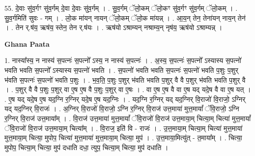 \documentclass[17pt]{extarticle}
\begin{document}
55. दे॒वाः सु॑व॒र्गꣳ सु॑व॒र्गम् दे॒वा दे॒वाः सु॑व॒र्गम् । . सु॒व॒र्गम् ॅलो॒कम् ॅलो॒कꣳ सु॑व॒र्गꣳ सु॑व॒र्गम् ॅलो॒कम् । . सु॒व॒र्गमिति॑ सुवः - गम् । . लो॒क मा॑यन् नायन् ॅलो॒कम् ॅलो॒क मा॑यन्न् । . आ॒य॒न् तेन॒ तेना॑यन् नाय॒न् तेन॑ । . तेन र्.ष॑य॒ ऋष॑य॒ स्तेन॒ तेन र्.ष॑यः । . ऋष॑यो ऽश्राम्यन् नश्राम्य॒न् नृष॑य॒ ऋष॑यो ऽश्राम्यन्न् । \newline

\textbf{Ghana Paata } \newline

1. नास्या᳚स्य॒ न नास्य॑ स॒पत्नः॑ स॒पत्नो᳚ ऽस्य॒ न नास्य॑ स॒पत्नः॑ । . अ॒स्य॒ स॒पत्नः॑ स॒पत्नो᳚ ऽस्यास्य स॒पत्नो॑ भवति भवति स॒पत्नो᳚ ऽस्यास्य स॒पत्नो॑ भवति । . स॒पत्नो॑ भवति भवति स॒पत्नः॑ स॒पत्नो॑ भवति प॒शुः प॒शुर् भ॑वति स॒पत्नः॑ स॒पत्नो॑ भवति प॒शुः । . भ॒व॒ति॒ प॒शुः प॒शुर् भ॑वति भवति प॒शुर् वै वै प॒शुर् भ॑वति भवति प॒शुर् वै । . प॒शुर् वै वै प॒शुः प॒शुर् वा ए॒ष ए॒ष वै प॒शुः प॒शुर् वा ए॒षः । . वा ए॒ष ए॒ष वै वा ए॒ष यद् यदे॒ष वै वा ए॒ष यत् । . ए॒ष यद् यदे॒ष ए॒ष यद॒ग्नि र॒ग्निर् यदे॒ष ए॒ष यद॒ग्निः । . यद॒ग्नि र॒ग्निर् यद् यद॒ग्निर् वि॒राजो॑ वि॒राजो॒ ऽग्निर् यद् यद॒ग्निर् वि॒राजः॑ । . अ॒ग्निर् वि॒राजो॑ वि॒राजो॒ ऽग्नि र॒ग्निर् वि॒राज॑ उत्त॒माया॑ मुत्त॒मायां᳚ ॅवि॒राजो॒ ऽग्नि र॒ग्निर् वि॒राज॑ उत्त॒माया᳚म् । . वि॒राज॑ उत्त॒माया॑ मुत्त॒मायां᳚ ॅवि॒राजो॑ वि॒राज॑ उत्त॒माया॒म् चित्या॒म् चित्या॑ मुत्त॒मायां᳚ ॅवि॒राजो॑ वि॒राज॑ उत्त॒माया॒म् चित्या᳚म् । . वि॒राज॒ इति॑ वि - राजः॑ । . उ॒त्त॒माया॒म् चित्या॒म् चित्या॑ मुत्त॒माया॑ मुत्त॒माया॒म् चित्या॒ मुपोप॒ चित्या॑ मुत्त॒माया॑ मुत्त॒माया॒म् चित्या॒ मुप॑ । . उ॒त्त॒माया॒मित्यु॑त् - त॒माया᳚म् । . चित्या॒ मुपोप॒ चित्या॒म् चित्या॒ मुप॑ दधाति दधा॒ त्युप॒ चित्या॒म् चित्या॒ मुप॑ दधाति । \newline
\end{document}
